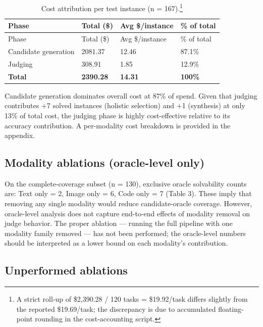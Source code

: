 \documentclass[10pt]{article}
\begin{document}
\begin{longtable}[]{@{}llll@{}}
\caption[Cost attribution per test instance (n = 167).]{Cost attribution
per test instance (n = 167).\footnote{A strict roll-up of \$2,390.28 /
  120 tasks = \$19.92/task differs slightly from the reported
  \$19.69/task; the discrepancy is due to accumulated floating-point
  rounding in the cost-accounting script.}}\tabularnewline
\toprule\noalign{}
Phase & Total (\$) & Avg \$/instance & \% of total \\
\midrule\noalign{}
\endfirsthead
\toprule\noalign{}
Phase & Total (\$) & Avg \$/instance & \% of total \\
\midrule\noalign{}
\endhead
\bottomrule\noalign{}
\endlastfoot
Candidate generation & 2081.37 & 12.46 & 87.1\% \\
Judging & 308.91 & 1.85 & 12.9\% \\
\textbf{Total} & \textbf{2390.28} & \textbf{14.31} & \textbf{100\%} \\
\end{longtable}

Candidate generation dominates overall cost at 87\% of spend. Given that
judging contributes +7 solved instances (holistic selection) and +1
(synthesis) at only 13\% of total cost, the judging phase is highly
cost-effective relative to its accuracy contribution. A per-modality
cost breakdown is provided in the appendix.

\hypertarget{modality-ablations-oracle-level-only}{%
\subsection{Modality ablations (oracle-level
only)}\label{modality-ablations-oracle-level-only}}

On the complete-coverage subset (n = 130), exclusive oracle solvability
counts are: Text only = 2, Image only = 6, Code only = 7 (Table 3).
These imply that removing any single modality would reduce
candidate-oracle coverage. However, oracle-level analysis does not
capture end-to-end effects of modality removal on judge behavior. The
proper ablation --- running the full pipeline with one modality family
removed --- has not been performed; the oracle-level numbers should be
interpreted as a lower bound on each modality's contribution.

\hypertarget{unperformed-ablations}{%
\subsection{Unperformed ablations}\label{unperformed-ablations}}
\end{document}
